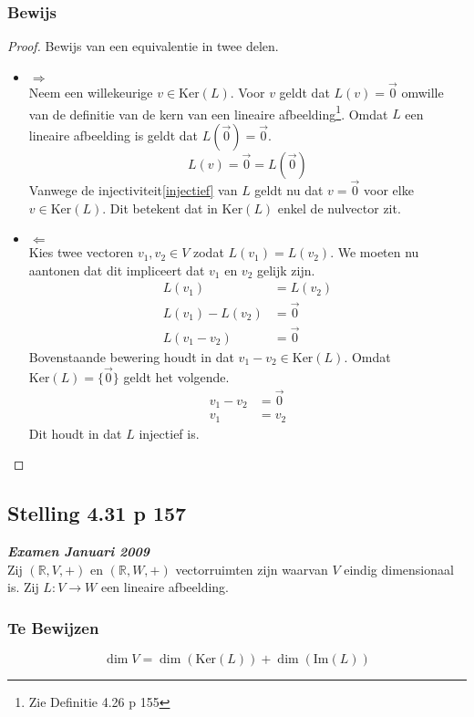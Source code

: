 \documentclass[lineaire_algebra_oplossingen.tex]{subfiles}
\begin{document}
\subsubsection*{Bewijs}
\begin{proof}
Bewijs van een equivalentie in twee delen.
\begin{itemize}
\item $\Rightarrow$\\
Neem een willekeurige $v\in \text{Ker}(L)$. Voor $v$ geldt dat $L(v) = \vec{0}$ omwille van de definitie van de kern van een lineaire afbeelding\footnote{Zie Definitie 4.26 p 155}. Omdat $L$ een lineaire afbeelding is geldt dat $L(\vec{0}) = \vec{0}$.
\[
L(v) = \vec{0} = L(\vec{0})
\]
Vanwege de injectiviteit\ref{injectief} van $L$ geldt nu dat $v=\vec{0}$ voor elke $v \in \text{Ker}(L)$. Dit betekent dat in $\text{Ker}(L)$ enkel de nulvector zit.

\item $\Leftarrow$\\
Kies twee vectoren $v_1,v_2 \in V$ zodat $L(v_1)=L(v_2)$. We moeten nu aantonen dat dit impliceert dat $v_1$ en $v_2$ gelijk zijn.
\begin{align*}
L(v_1) &= L(v_2) \\
L(v_1)-L(v_2) &= \vec{0} \\
L(v_1-v_2) &= \vec{0}
\end{align*}
Bovenstaande bewering houdt in dat $v_1-v_2 \in \text{Ker}(L)$. Omdat $\text{Ker}(L) = \{\vec{0}\}$ geldt het volgende.
\begin{align*}
v_1-v_2 &= \vec{0} \\
v_1 &= v_2
\end{align*}
Dit houdt in dat $L$ injectief is.
\end{itemize}
\end{proof}


\subsection{Stelling 4.31 p 157}
\label{4.31}
\textit{\textbf{Examen Januari 2009}}\\
Zij $(\mathbb{R},V,+)$ en $(\mathbb{R},W,+)$ vectorruimten zijn waarvan $V$ eindig dimensionaal is. Zij $L:V\rightarrow W$ een lineaire afbeelding.
\subsubsection*{Te Bewijzen}
\[
\dim V = \dim (\text{Ker}(L)) + \dim (\text{Im}(L))
\]
\end{document}
